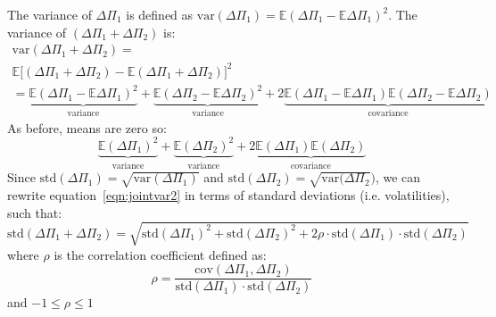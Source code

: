 \documentclass[../analytical_approach.tex]{subfiles}
\begin{document}
The variance of $\Delta\Pi_1$ is defined as $\text{var}(\Delta\Pi_1)=\mathbb{E}(\Delta\Pi_1-\mathbb{E}\Delta\Pi_1)^2$.
The variance of $(\Delta\Pi_1+\Delta\Pi_2)$ is:
\begin{multline}
    \label{eqn:jointvar}
    \text{var}(\Delta\Pi_1+\Delta\Pi_2) =\\ \mathbb{E}\big[(\Delta\Pi_1+\Delta\Pi_2)-\mathbb{E}(\Delta\Pi_1+\Delta\Pi_2)\big]^2
    \\= \underbrace{\mathbb{E}(\Delta\Pi_1-\mathbb{E}\Delta\Pi_1)^2}_\textrm{variance} + \underbrace{\mathbb{E}(\Delta\Pi_2-\mathbb{E}\Delta\Pi_2)^2}_\textrm{variance} + 2\underbrace{\mathbb{E}(\Delta\Pi_1-\mathbb{E}\Delta\Pi_1)\mathbb{E}(\Delta\Pi_2-\mathbb{E}\Delta\Pi_2)}_\textrm{covariance}
\end{multline}
As before, means are zero so:
\begin{equation}
    \label{eqn:jointvar2}
    \underbrace{\mathbb{E}(\Delta\Pi_1)^2}_\textrm{variance} + \underbrace{\mathbb{E}(\Delta\Pi_2)^2}_\textrm{variance} + 2\underbrace{\mathbb{E}(\Delta\Pi_1)\mathbb{E}(\Delta\Pi_2)}_\textrm{covariance}
\end{equation}
Since $\text{std}(\Delta\Pi_1)=\sqrt{\text{var}(\Delta\Pi_1)}$ and $\text{std}(\Delta\Pi_2)=\sqrt{\text{var}(\Delta\Pi_2})$, we can rewrite equation~\ref{eqn:jointvar2} in terms of standard deviations (i.e. volatilities), such that:
\begin{equation}
    \label{eqn:jointstdev}
    \text{std}(\Delta\Pi_1+\Delta\Pi_2) = \sqrt{\text{std}(\Delta\Pi_1)^2 + \text{std}(\Delta\Pi_2)^2 +2\rho\cdot\text{std}(\Delta\Pi_1)\cdot\text{std}(\Delta\Pi_2)}
\end{equation}
where $\rho$ is the correlation coefficient defined as:
\begin{equation}
    \label{eqn:correlation}
    \rho = \frac{\text{cov}(\Delta\Pi_1,\Delta\Pi_2)}{\text{std}(\Delta\Pi_1)\cdot\text{std}(\Delta\Pi_2)}
\end{equation}
and $-1\leq\rho\leq1$
\end{document}
